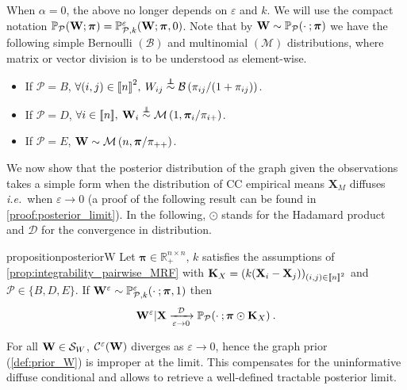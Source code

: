 When $\alpha = 0$, the above no longer depends on $\varepsilon$ and $k$. We will use the compact notation $\mathbb{P}_{\mathcal{P}}(\mathbf{W} ; \bm{\pi}) = \mathbb{P}_{\mathcal{P},k}^{\varepsilon}(\mathbf{W}; \bm{\pi}, 0)$. Note that by $\mathbf{W} \sim \mathbb{P}_{\mathcal{P}}(\cdot \: ; \bm{\pi})$ we have the following simple Bernoulli $(\mathcal{B})$ and multinomial $(\mathcal{M})$ distributions, where matrix or vector division is to be understood as element-wise.
\begin{itemize}
    \item If $\mathcal{P} = B$, $\forall (i,j) \in {[\![n]\!]}^2, \: W_{ij} \stackrel{\perp\!\!\!\!\perp}{\sim} \mathcal{B}\left(\pi_{ij}/(1 + \pi_{ij}) \right)$.
    \item If $\mathcal{P} = D$, $\forall i \in {[\![n]\!]}, \: \mathbf{W}_{i} \stackrel{\perp\!\!\!\!\perp}{\sim} \mathcal{M}\left(1, \bm{\pi}_{i}/\pi_{i+} \right)$.
    \item If $\mathcal{P} = E$, $\mathbf{W} \sim \mathcal{M}\left(n, \bm{\pi}/\pi_{++} \right)$.
\end{itemize}

We now show that the posterior distribution of the graph given the observations takes a simple form when the distribution of CC empirical means $\bm{X}_{M}$ diffuses \textit{i.e.}\ when $\varepsilon \to 0$ (a proof of the following result can be found in \cref{proof:posterior_limit}). In the following, $\odot$ stands for the Hadamard product and $\mathcal{D}$ for the convergence in distribution.

\begin{restatable}{proposition}{posteriorW}
\label{prop:posterior_W}
Let $\bm{\pi} \in \mathbb{R}_+^{n \times n}$, $k$ satisfies the assumptions of \cref{prop:integrability_pairwise_MRF} with  $\mathbf{K}_{X} = (k(\mathbf{X}_{i} - \mathbf{X}_{j}))_{(i,j) \in {[\![n]\!]}^2}$ and $\mathcal{P}\in \{B, D, E\}$. If $\mathbf{W}^{\varepsilon} \sim \mathbb{P}_{\mathcal{P},k}^{\varepsilon}(\cdot \: ; \bm{\pi},1)$ then
$$\mathbf{W}^{\varepsilon} | \mathbf{X} \xrightarrow[\varepsilon \to 0]{\mathcal{D}} \mathbb{P}_{\mathcal{P}}(\cdot \: ;\bm{\pi} \odot \mathbf{K}_{X}) \:.$$
\end{restatable}

\begin{remark}
For all $\mathbf{W} \in \mathcal{S}_{W}$, $\mathcal{C}^{\varepsilon}(\mathbf{W})$ diverges as $\varepsilon \to 0$, hence the graph prior (\cref{def:prior_W}) is improper at the limit. This compensates for the uninformative diffuse conditional and allows to retrieve a well-defined tractable posterior limit.
\end{remark}

